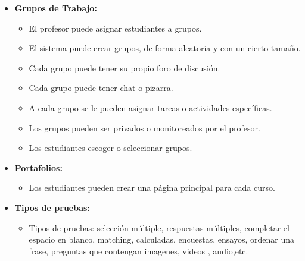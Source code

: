 	\begin{itemize}
		\item \textbf{Grupos de Trabajo:}
			\begin{itemize}
				\item El profesor puede asignar estudiantes a grupos.
				\item El sistema puede crear grupos, de forma aleatoria y con un cierto tamaño.
				\item Cada grupo puede tener su propio foro de discusión.
				\item Cada grupo puede tener chat o pizarra.
				\item A cada grupo se le pueden asignar tareas o actividades específicas.
				\item Los grupos pueden ser privados o monitoreados por el profesor.
				\item Los estudiantes escoger o seleccionar grupos.
			\end{itemize}
	\end{itemize}
	\begin{itemize}
		\item \textbf{Portafolios:}
			\begin{itemize}
				\item Los estudiantes pueden crear una página principal para cada curso.
			\end{itemize}
	\end{itemize}
	\begin{itemize}
		\item \textbf{Tipos de pruebas:}
			\begin{itemize}
				\item Tipos de pruebas: selección múltiple, respuestas múltiples, completar el espacio en blanco, matching, calculadas, encuestas, ensayos, ordenar una frase, preguntas que contengan imagenes, videos , audio,etc.
			\end{itemize}
	\end{itemize}
